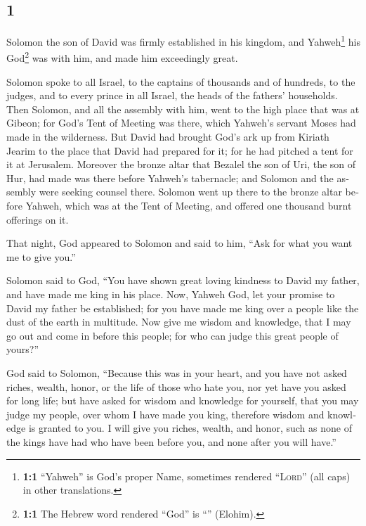\begin{paracol}{2}
\switchcolumn
\begin{otherlanguage}{english}

\hypertarget{section-1}{%
\section{1}\label{section-1}}

 Solomon the son of David was firmly established in his
kingdom, and Yahweh\footnote{\textbf{1:1} ``Yahweh'' is God's proper
  Name, sometimes rendered ``\textsc{Lord}'' (all caps) in other
  translations.} his God\footnote{\textbf{1:1} The Hebrew word rendered
  ``God'' is ``'' (Elohim).} was with him, and made him
exceedingly great.

 Solomon spoke to all Israel, to the captains of thousands
and of hundreds, to the judges, and to every prince in all Israel, the
heads of the fathers' households.  Then Solomon, and all
the assembly with him, went to the high place that was at Gibeon; for
God's Tent of Meeting was there, which Yahweh's servant Moses had made
in the wilderness.  But David had brought God's ark up
from Kiriath Jearim to the place that David had prepared for it; for he
had pitched a tent for it at Jerusalem.  Moreover the
bronze altar that Bezalel the son of Uri, the son of Hur, had made was
there before Yahweh's tabernacle; and Solomon and the assembly were
seeking counsel there.  Solomon went up there to the
bronze altar before Yahweh, which was at the Tent of Meeting, and
offered one thousand burnt offerings on it.

 That night, God appeared to Solomon and said to him,
``Ask for what you want me to give you.''

 Solomon said to God, ``You have shown great loving
kindness to David my father, and have made me king in his place.
 Now, Yahweh God, let your promise to David my father be
established; for you have made me king over a people like the dust of
the earth in multitude.  Now give me wisdom and
knowledge, that I may go out and come in before this people; for who can
judge this great people of yours?''

 God said to Solomon, ``Because this was in your heart,
and you have not asked riches, wealth, honor, or the life of those who
hate you, nor yet have you asked for long life; but have asked for
wisdom and knowledge for yourself, that you may judge my people, over
whom I have made you king,  therefore wisdom and
knowledge is granted to you. I will give you riches, wealth, and honor,
such as none of the kings have had who have been before you, and none
after you will have.''


\end{otherlanguage}
\end{paracol}
